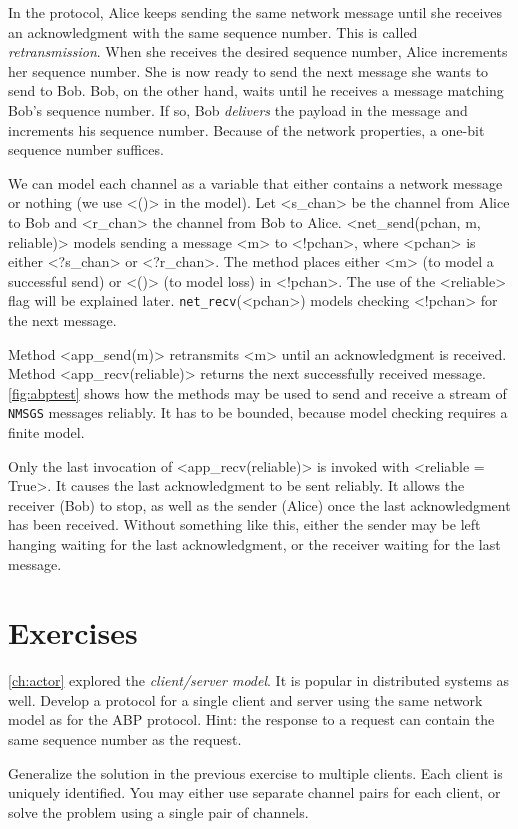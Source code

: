 \documentclass{report}
\begin{document}
In the protocol, Alice keeps sending the same network message until she
receives an acknowledgment with the same sequence number.
This is called \emph{retransmission}.
%
When she receives the desired sequence number, Alice increments her sequence number.
She is now ready to send the next message she wants to send to Bob.
Bob, on the other hand, waits until he receives a message matching
Bob's sequence number.  If so, Bob \emph{delivers} the payload in the
message and increments his sequence number.
Because of the network properties,  a one-bit sequence number suffices.

We can model each
channel as a variable that either contains a network message or nothing
(we use <{()}> in the model).  Let <{s_chan}> be the channel
from Alice to Bob and <{r_chan}> the channel from Bob to Alice.
<{net_send(pchan, m, reliable)}> models sending a message <{m}> to
<{!pchan}>, where <{pchan}> is either <{?s_chan}> or <{?r_chan}>.
The method places either <{m}> (to model a successful send)
or <{()}> (to model loss) in <{!pchan}>.
The use of the <{reliable}> flag will be explained later.
\texttt{net\_recv}(<{pchan}>) models checking <{!pchan}> for
the next message.

Method <{app_send(m)}> retransmits <{m}> until
an acknowledgment is received.
Method <{app_recv(reliable)}> returns the next successfully received
message.
\autoref{fig:abptest} shows how the methods may be used to send and receive
a stream of \texttt{NMSGS} messages reliably.
It has to be bounded, because model checking requires a finite model.

Only the last invocation of <{app_recv(reliable)}> is invoked with
<{reliable = True}>.  It causes the last acknowledgment to be sent
reliably.  It allows the receiver (Bob) to stop, as well as the sender (Alice)
once the last acknowledgment has been received.
Without something like this, either the sender may be left hanging waiting
for the last acknowledgment, or the receiver waiting for the last message.

\section*{Exercises}
\begin{problems}
\item \autoref{ch:actor} explored the \emph{client/server model}.  It is popular
in distributed systems as well.
Develop a protocol for a single client and server using the same network
model as for the ABP protocol.
Hint: the response to a request can contain the same sequence number as the
request.
\item Generalize the solution in the previous exercise to multiple clients.
Each client is uniquely identified.  You may either use separate channel pairs
for each client, or solve the problem using a single pair of channels.
\end{problems}
\end{document}

